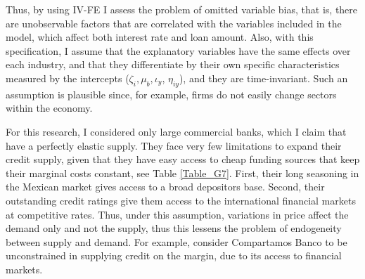 \documentclass[11pt, oneside]{book}
\begin{document}
Thus, by using IV-FE I assess the problem of omitted variable bias, that is, there are unobservable factors that are correlated  with the variables included in the model, which affect both interest rate and loan amount. Also, with this specification, I  assume that the explanatory variables have the same effects over each industry, and that they differentiate by their own specific characteristics measured by the intercepts ($\zeta_{i}, \mu_{b}, \iota_y$, $\eta_{iy}$), and they are time-invariant. Such an assumption is plausible since, for example, firms do not easily change sectors within the economy. 

For this research, I considered only large commercial banks, which I claim that have a perfectly elastic supply. They face very few limitations to expand their credit supply, given that they have easy access to cheap funding sources that keep their marginal costs constant, see Table \ref{Table_G7}. First, their long seasoning in the Mexican market gives access to a broad depositors base. Second, their outstanding credit ratings give them access to the international financial markets at competitive rates. Thus, under this assumption, variations in price affect the demand only and not the supply, thus this lessens the problem of endogeneity between supply and demand. For example,  \cite[p. 170]{karlan2019long} consider Compartamos Banco to be unconstrained in supplying credit on the margin, due to its access to financial markets. 
\end{document}
